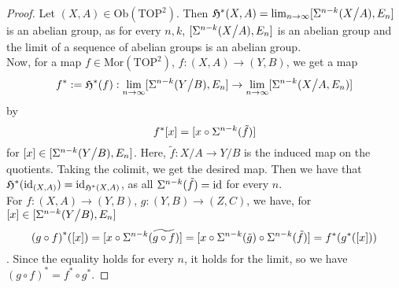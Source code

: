 \documentclass[a4paper,12pt]{article}
\begin{document}
\begin{proof}
    Let \((X,A)\in\mathrm{Ob}(\mathrm{TOP}^2)\). Then \(\mathfrak{H}^\ast(X,A)=\lim_{n\to\infty}[\Sigma^{n-k}(X\big/A),E_n]\) is an abelian group, as for every \(n,k\), \([\Sigma^{n-k}(X\big/A),E_n]\) is an abelian group and the limit of a sequence of abelian groups is an abelian group.\\
    Now, for a map \(f\in\mathrm{Mor}(\mathrm{TOP}^2)\), \(f:(X,A)\to(Y,B)\), we get a map
    \[f^\ast:=\mathfrak{H}^\ast(f):\lim_{n\to\infty}[\Sigma^{n-k}(Y\big/B),E_n]\to\lim_{n\to\infty}[\Sigma^{n-k}(X\big/A,E_n)]\]
    by
    \[f^\ast [x]= [x\circ\Sigma^{n-k}(\tilde{f})]\]
    for \([x]\in[\Sigma^{n-k}(Y\big/B),E_n]\). Here, \(\tilde{f}:X\big/A\to Y\big/B\) is the induced map on the quotients.
    Taking the colimit, we get the desired map.
    Then we have that \(\mathfrak{H}^\ast(\mathrm{id}_{(X,A)})=\mathrm{id}_{\mathfrak{H}^\ast(X,A)}\), as all \(\Sigma^{n-k}(\tilde{f})=\mathrm{id}\) for every \(n\).\\
    For \(f:(X,A)\to(Y,B)\), \(g:(Y,B)\to(Z,C)\), we have, for \([x]\in[\Sigma^{n-k}(Y\big/B),E_n]\)
    \[{(g\circ f)}^\ast([x])=[x\circ\sus^{n-k}(\widetilde{g\circ f})]=[x\circ\sus^{n-k}(\tilde{g})\circ \sus^{n-k}(\tilde{f})]=%
    f^\ast(g^\ast([x]))\].
    Since the equality holds for every \(n\), it holds for the limit, so we have
    \({(g\circ f)}^\ast=f^\ast\circ g^\ast\).
\end{proof}
\end{document}
